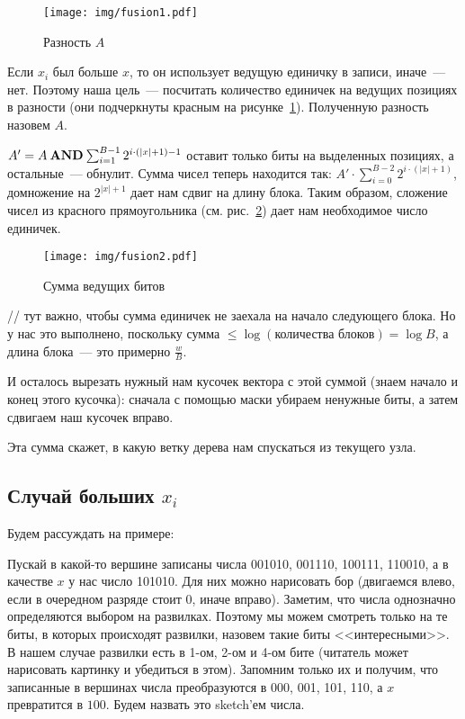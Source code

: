 \begin{figure}[h]
    \centering
    \label{fig:arinaDifference}
    \texttt{[image: img/fusion1.pdf]}
    \caption{Разность $A$}
\end{figure}

Если $x_i$ был больше $x$, то он использует ведущую единичку в записи, иначе~--- нет. Поэтому наша цель~--- посчитать количество единичек на ведущих позициях в разности (они подчеркнуты красным на рисунке~\ref{fig:arinaDifference}). Полученную разность назовем $A$.

$A' = A \mathbin{\operatorname{\mathbf{AND}}} \sum_{i=1}^{B-1} 2^{i\cdot(|x|+1)-1}$ оставит только биты на выделенных позициях, а остальные~--- обнулит. Сумма чисел теперь находится так: $A' \cdot \sum_{i=0}^{B-2} 2^{i\cdot(|x|+1)}$, домножение на $2^{|x|+1}$ дает нам сдвиг на длину блока. Таким образом, сложение чисел из красного прямоугольника (см. рис.~\ref{fig:arinaSum}) дает нам необходимое число единичек.

\begin{figure}[h]
    \centering
    \label{fig:arinaSum}
    \texttt{[image: img/fusion2.pdf]}
    \caption{Сумма ведущих битов}
\end{figure}

// тут важно, чтобы сумма единичек не заехала на начало следующего блока. Но у нас это выполнено, поскольку сумма $\leqslant \log(\text{количества блоков}) = \log B$, а длина блока~--- это примерно $\frac{w}{B}$.

И осталось вырезать нужный нам кусочек вектора с этой суммой (знаем начало и конец этого кусочка): сначала с помощью маски убираем ненужные биты, а затем сдвигаем наш кусочек вправо.

Эта сумма скажет, в какую ветку дерева нам спускаться из текущего узла.

\bigskip

\subsection{Случай больших $x_i$}

Будем рассуждать на примере:

Пускай в какой-то вершине записаны числа 001010, 001110, 100111, 110010, а в качестве $x$ у нас число 101010. Для них можно нарисовать бор (двигаемся влево, если в очередном разряде стоит $0$, иначе вправо). Заметим, что числа однозначно определяются выбором на развилках. Поэтому мы можем смотреть только на те биты, в которых происходят развилки, назовем такие биты <<интересными>>. В нашем случае развилки есть в 1-ом, 2-ом и 4-ом бите (читатель может нарисовать картинку и убедиться в этом). Запомним только их и получим, что записанные в вершинах числа преобразуются в 000, 001, 101, 110, а $x$ превратится в $100$. Будем назвать это sketch'ем числа.

